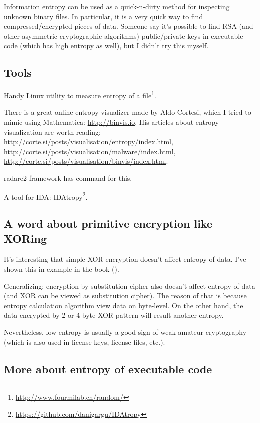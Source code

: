 Information entropy can be used as a quick-n-dirty method for inspecting unknown binary files.
In particular, it is a very quick way to find compressed/encrypted pieces of data.
Someone say it's possible to find RSA (and other asymmetric cryptographic algorithms) public/private keys 
in executable code (which has high entropy as well), but I didn't try this myself.

\subsection{Tools}

Handy Linux  utility to measure entropy of a file\footnote{\url{http://www.fourmilab.ch/random/}}.

There is a great online entropy visualizer made by Aldo Cortesi, 
which I tried to mimic using Mathematica: \url{http://binvis.io}.
His articles about entropy visualization are worth reading:
\url{http://corte.si/posts/visualisation/entropy/index.html},
\url{http://corte.si/posts/visualisation/malware/index.html},
\url{http://corte.si/posts/visualisation/binvis/index.html}.

radare2 framework has  command for this.

A tool for IDA: IDAtropy\footnote{\url{https://github.com/danigargu/IDAtropy}}.

\subsection{A word about primitive encryption like XORing}

It's interesting that simple XOR encryption doesn't affect entropy of data.
I've shown this in  example in the book ().

Generalizing: encryption by substitution cipher also doesn't affect entropy of data (and XOR can be viewed as substitution cipher).
The reason of that is because entropy calculation algorithm view data on byte-level.
On the other hand, the data encrypted by 2 or 4-byte XOR pattern will result another entropy.

Nevertheless, low entropy is usually a good sign of weak amateur cryptography
(which is also used in license keys, license files, etc.).

\subsection{More about entropy of executable code}

